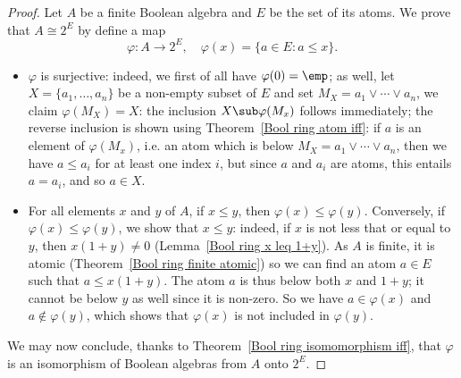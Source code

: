 \begin{proof}
Let $A$ be a finite Boolean algebra and $E$ be the set of its atoms. We prove that $A\cong 2^E$ by define a map
\[\varphi:A\to 2^E,\quad \varphi(x)=\{a\in E:a\leq x\}.\]
\begin{itemize}
\item $\varphi$ is surjective: indeed, we first of all have $\varphi(0)=\emp$; as well, let $X=\{a_1,\dots,a_n\}$ 
be a non-empty subset of $E$ and set $M_X=a_1\vee\cdots\vee a_n$, we claim $\varphi(M_X)=X$: the inclusion $X\sub\varphi(M_x)$ 
follows immediately; the reverse inclusion is shown using Theorem~\ref{Bool ring atom iff}: if $a$ is an element of $\varphi(M_x)$, 
i.e. an atom which is below $M_X=a_1\vee\cdots\vee a_n$, then we have $a\leq a_i$ for at least one index $i$, but since $a$ and $a_i$ 
are atoms, this entails $a=a_i$, and so $a\in X$.\par
\item For all elements $x$ and $y$ of $A$, if $x\leq y$, then $\varphi(x)\leq\varphi(y)$. Conversely, if $\varphi(x)\leq\varphi(y)$, we show 
that $x\leq y$: indeed, if $x$ is not less that or equal to $y$, then $x(1+y)\neq 0$ (Lemma~\ref{Bool ring x leq 1+y}). As $A$ is finite, it is
atomic (Theorem~\ref{Bool ring finite atomic}) so we can find an atom $a\in E$ such that $a\leq x(1+y)$. The atom $a$ is thus below both $x$ and $1+y$; 
it cannot be below $y$ as well since it is non-zero. So we have $a\in \varphi(x)$ and $a\notin\varphi(y)$, which shows that $\varphi(x)$ is not
included in $\varphi(y)$.
\end{itemize}
We may now conclude, thanks to Theorem~\ref{Bool ring isomomorphism iff}, that $\varphi$ is an isomorphism of Boolean algebras from $A$ onto $2^E$.
\end{proof}
